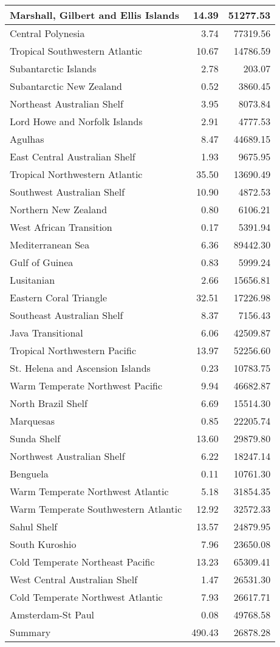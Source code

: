 \begin{table}
\begin{tabular}[t]{l|r|r}
\hline
Marshall, Gilbert and Ellis Islands & 14.39 & 51277.53\\
\hline
Central Polynesia & 3.74 & 77319.56\\
\hline
Tropical Southwestern Atlantic & 10.67 & 14786.59\\
\hline
Subantarctic Islands & 2.78 & 203.07\\
\hline
Subantarctic New Zealand & 0.52 & 3860.45\\
\hline
Northeast Australian Shelf & 3.95 & 8073.84\\
\hline
Lord Howe and Norfolk Islands & 2.91 & 4777.53\\
\hline
Agulhas & 8.47 & 44689.15\\
\hline
East Central Australian Shelf & 1.93 & 9675.95\\
\hline
Tropical Northwestern Atlantic & 35.50 & 13690.49\\
\hline
Southwest Australian Shelf & 10.90 & 4872.53\\
\hline
Northern New Zealand & 0.80 & 6106.21\\
\hline
West African Transition & 0.17 & 5391.94\\
\hline
Mediterranean Sea & 6.36 & 89442.30\\
\hline
Gulf of Guinea & 0.83 & 5999.24\\
\hline
Lusitanian & 2.66 & 15656.81\\
\hline
Eastern Coral Triangle & 32.51 & 17226.98\\
\hline
Southeast Australian Shelf & 8.37 & 7156.43\\
\hline
Java Transitional & 6.06 & 42509.87\\
\hline
Tropical Northwestern Pacific & 13.97 & 52256.60\\
\hline
St. Helena and Ascension Islands & 0.23 & 10783.75\\
\hline
Warm Temperate Northwest Pacific & 9.94 & 46682.87\\
\hline
North Brazil Shelf & 6.69 & 15514.30\\
\hline
Marquesas & 0.85 & 22205.74\\
\hline
Sunda Shelf & 13.60 & 29879.80\\
\hline
Northwest Australian Shelf & 6.22 & 18247.14\\
\hline
Benguela & 0.11 & 10761.30\\
\hline
Warm Temperate Northwest Atlantic & 5.18 & 31854.35\\
\hline
Warm Temperate Southwestern Atlantic & 12.92 & 32572.33\\
\hline
Sahul Shelf & 13.57 & 24879.95\\
\hline
South Kuroshio & 7.96 & 23650.08\\
\hline
Cold Temperate Northeast Pacific & 13.23 & 65309.41\\
\hline
West Central Australian Shelf & 1.47 & 26531.30\\
\hline
Cold Temperate Northwest Atlantic & 7.93 & 26617.71\\
\hline
Amsterdam-St Paul & 0.08 & 49768.58\\
\hline
Summary & 490.43 & 26878.28\\
\hline
\end{tabular}
\end{table}
